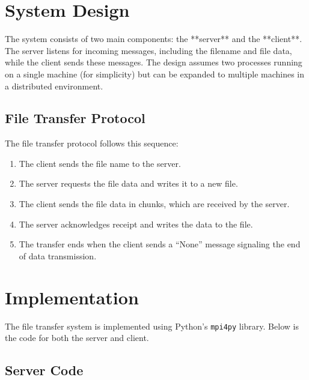 \documentclass[a4paper,12pt]{article}
\begin{document}
\section{System Design}
The system consists of two main components: the **server** and the **client**. The server listens for incoming messages, including the filename and file data, while the client sends these messages. The design assumes two processes running on a single machine (for simplicity) but can be expanded to multiple machines in a distributed environment.

\subsection{File Transfer Protocol}
The file transfer protocol follows this sequence:
\begin{enumerate}
    \item The client sends the file name to the server.
    \item The server requests the file data and writes it to a new file.
    \item The client sends the file data in chunks, which are received by the server.
    \item The server acknowledges receipt and writes the data to the file.
    \item The transfer ends when the client sends a ``None'' message signaling the end of data transmission.
\end{enumerate}

\section{Implementation}
The file transfer system is implemented using Python's \texttt{mpi4py} library. Below is the code for both the server and client.

\subsection{Server Code}
\end{document}
